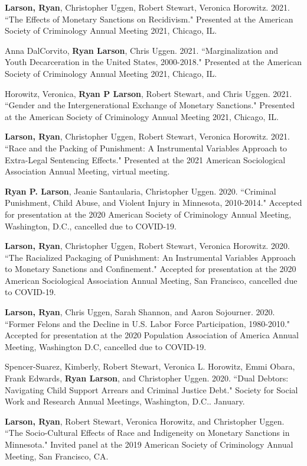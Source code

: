 \documentclass[letterpaper]{article}
\renewenvironment{itemize}{
  \begin{list}{}{
    \setlength{\leftmargin}{1.5em}
  }
}{
  \end{list}
}
\begin{document}
\begin{itemize}
\item \textbf{Larson, Ryan}, Christopher Uggen, Robert Stewart, Veronica Horowitz. 2021. ``The Effects of Monetary Sanctions on Recidivism." Presented at the American Society of Criminology Annual Meeting 2021, Chicago, IL. 
\item Anna DalCorvito, \textbf{Ryan Larson}, Chris Uggen. 2021. ``Marginalization and Youth Decarceration in the United States, 2000-2018." Presented at the American Society of Criminology Annual Meeting 2021, Chicago, IL. 
\item Horowitz, Veronica, \textbf{Ryan P Larson}, Robert Stewart, and Chris Uggen. 2021. ``Gender and the Intergenerational Exchange of Monetary Sanctions." Presented at the American Society of Criminology Annual Meeting 2021, Chicago, IL. 
\item \textbf{Larson, Ryan}, Christopher Uggen, Robert Stewart, Veronica Horowitz. 2021. ``Race and the Packing of Punishment: A Instrumental Variables Approach to Extra-Legal Sentencing Effects." Presented at the 2021 American Sociological Association Annual Meeting, virtual meeting. 
\item \textbf{Ryan P. Larson}, Jeanie Santaularia, Christopher Uggen. 2020. ``Criminal Punishment, Child Abuse, and Violent Injury in Minnesota, 2010-2014." Accepted for presentation at the 2020 American Society of Criminology Annual Meeting, Washington, D.C., cancelled due to COVID-19.  
\item \textbf{Larson, Ryan}, Christopher Uggen, Robert Stewart, Veronica Horowitz. 2020. ``The Racialized Packaging of Punishment: An Instrumental Variables Approach to Monetary Sanctions and Confinement." Accepted for presentation at the 2020 American Sociological Association Annual Meeting, San Francisco, cancelled due to COVID-19. 
\item \textbf{Larson, Ryan}, Chris Uggen, Sarah Shannon, and Aaron Sojourner. 2020. ``Former Felons and the Decline in U.S. Labor Force Participation, 1980-2010." Accepted for presentation at the 2020 Population Association of America Annual Meeting, Washington D.C, cancelled due to COVID-19. 
\item Spencer-Suarez, Kimberly, Robert Stewart, Veronica L. Horowitz, Emmi Obara, Frank Edwards, \textbf{Ryan Larson}, and Christopher Uggen. 2020. ``Dual Debtors: Navigating Child Support Arrears and Criminal Justice Debt." Society for Social Work and Research Annual Meetings, Washington, D.C.. January.
\item \textbf{Larson, Ryan}, Robert Stewart, Veronica Horowitz, and Christopher Uggen. ``The Socio-Cultural Effects of Race and Indigeneity on Monetary Sanctions in Minnesota." Invited panel at the 2019 American Society of Criminology Annual Meeting, San Francisco, CA.

\end{itemize}
\end{document}

